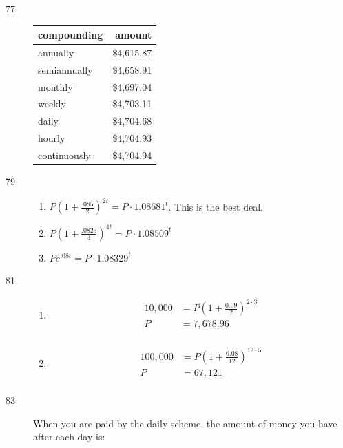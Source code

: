 \documentclass{exam}
\begin{document}
\begin{description}
      \item[77]
        \begin{tabular}[H]{lr}
          \toprule
          compounding  & amount \\
          \midrule
          annually     & \$4,615.87 \\
          semiannually & \$4,658.91 \\
          monthly      & \$4,697.04 \\
          weekly       & \$4,703.11 \\
          daily        & \$4,704.68 \\
          hourly       & \$4,704.93 \\
          continuously & \$4,704.94 \\
          \bottomrule
        \end{tabular}

      \item[79]
        \begin{enumerate}[i]
          \item $P \left( 1 + \frac{.085}{2} \right)^{2t} = \boxed{P \cdot 1.08681^t}$.  This is the best deal.
          \item $P \left( 1 + \frac{.0825}{4} \right)^{4t} = \boxed{P \cdot 1.08509^t}$
          \item $P e^{.08t} = \boxed{P \cdot 1.08329^t}$
        \end{enumerate}

      \item[81]
        \begin{enumerate}[a]
          \item 
            \begin{align*}
              10,000 &= P  \left( 1 + \frac{0.09}{2} \right)^{2 \cdot 3} \\
              P      &= \boxed{7,678.96} \\
            \end{align*}

          \item 
            \begin{align*}
              100,000 &= P  \left( 1 + \frac{0.08}{12} \right)^{12 \cdot 5} \\
              P       &= \boxed{67,121} \\
            \end{align*}
        \end{enumerate}

      \item[83]
        When you are paid by the daily scheme, the amount of money you have after each day is:


\end{description}
\end{document}
